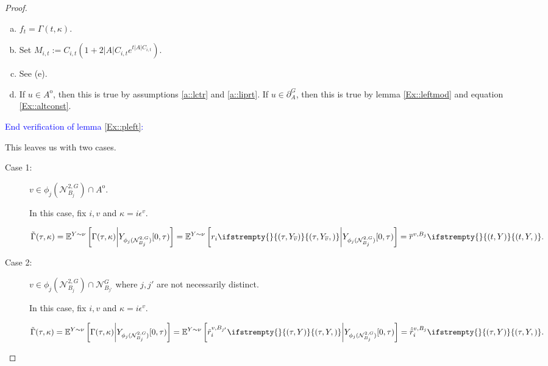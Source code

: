 \documentclass[12pt]{article}
\newcommand{\skipLine}{\vspace{12pt}}
\newcommand{\mb}{\mathbb}
\newcommand{\mc}{\mathcal}
\newcommand{\ov}{\overline}
\newcommand{\ep}{\epsilon}
\newcommand{\tb}{\textcolor{blue}}
\newcommand{\exmu}[2]{\mb{E}^{#1}\left[#2\right]}	%
\newcommand{\defeq}{:=}								%
\newcommand{\gneigh}[2]{\mc{N}^{#1}_{#2}}			%
\newcommand{\dgneigh}[2]{\mc{N}^{2,#1}_{#2}}		%
\newcommand{\cl}[1]{\ov{#1}}						%
\newcommand{\gbdry}[2]{\partial^{#1}_{#2}}			%
\newcommand{\rate}{r}								%
\newcommand{\vind}[1]{_{#1}}						%
\newcommand{\tmi}[1]{#1}							%
\newcommand{\stpara}[1]{_{#1}}						%
\newcommand{\jumpibd}[2]{C_{#1,#2}}					%
\newcommand{\tmepro}[3]{
\ifstrempty{#3}{
	\left(#1,#2\right)}{
	\left(#1,#2,#3\right)}}							%
\newcommand{\Xg}{Y}									%
\newcommand{\brate}{\alt{\rate}}					%
\newcommand{\inte}[1]{{#1}^\mathrm{o}}				%
\newcommand{\alt}[1]{\tilde{#1}}					%
\newcommand{\rt}{\tau}								%
\renewcommand{\mark}{\kappa}						%
\newcommand{\ratee}{\Gamma}							%
\newcommand{\cratee}{\alt{\ratee}}					%
\newcommand{\mm}{\nu}								%
\newcommand{\ev}[1]{\ep^{#1}}						%
\newcommand{\const}{M}								%
\newcommand{\sttpara}[2]{_{#1,#2}}					%
\newcommand{\bgrate}{\ov{\rate}}					%
\newcommand{\bcrate}{\hat{\brate}}					%
\newcommand{\vjpara}[2]{^{#1,#2}}					%
\begin{document}
\begin{proof}
\begin{enumerate}[(a)]
\item \(f_t = \ratee(t,\mark)\).

\item Set \(\const\sttpara{i}{t} \defeq \jumpibd{i}{t}(1 + 2|A|\jumpibd{i}{t}e^{t|A|\jumpibd{i}{t}})\).

\item See (e).

\item If \(u \in \inte{A}\), then this is true by assumptions \ref{a::lctr} and \ref{a::liprt}. If \(u \in \gbdry{G}{A}\), then this is true by lemma \ref{Ex::leftmod} and equation \eqref{Ex::altconst}.
\end{enumerate}

\skipLine

\tb{End verification of lemma \ref{Ex::pleft}:}

\skipLine

This leaves us with two cases.

\begin{description}
\item[Case 1: ] \(v \in \phi_j(\dgneigh{G}{B_j})\cap\inte{A}\).

In this case, fix \(i,v\) and \(\mark = i\ev{v}\).

\begin{align*}
\cratee(\rt,\mark) &= \exmu{\Xg\sim\mm}{\ratee(\rt,\mark)\middle|\Xg\vind{\phi_j(\dgneigh{G}{B_j})}\tmi{[0,\rt)}} = \exmu{\Xg\sim\mm}{\rate\stpara{i}\tmepro{\rt}{\Xg\vind{\cl{v}}}{}\middle|\Xg\vind{\phi_j(\dgneigh{G}{B_j})}\tmi{[0,\rt)}} = \bgrate\vjpara{v}{B_j}\tmepro{t}{\Xg}{}.
\end{align*}

\skipLine

\item[Case 2: ] \(v \in \phi_j(\dgneigh{G}{B_j})\cap\gneigh{G}{B_{j'}}\) where \(j,j'\) are not necessarily distinct.

In this case, fix \(i,v\) and \(\mark = i\ev{v}\).

\begin{align*}
\cratee(\rt,\mark) &= \exmu{\Xg\sim\mm}{\ratee(\rt,\mark)\middle|\Xg\vind{\phi_j(\dgneigh{G}{B_j})}\tmi{[0,\rt)}} = \exmu{\Xg\sim\mm}{\brate\vjpara{v}{B_{j'}}\stpara{i}\tmepro{\rt}{\Xg}{}\middle|\Xg\vind{\phi_j(\dgneigh{G}{B_j})}\tmi{[0,\rt)}} = \bcrate\vjpara{v}{B_j}\stpara{i}\tmepro{\rt}{\Xg}{}.
\end{align*}


\end{description}
\end{proof}
\end{document}
